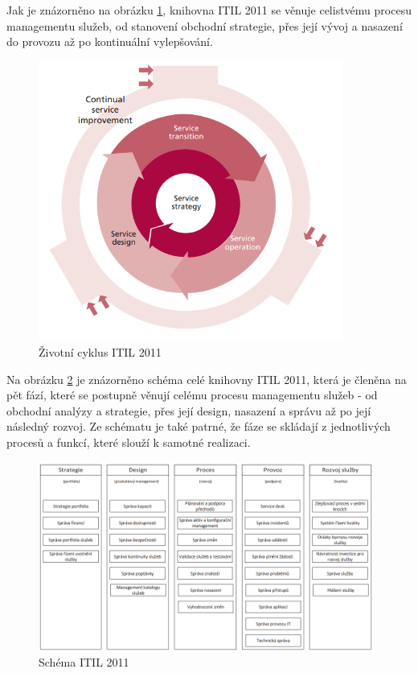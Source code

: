 \documentclass[
  digital,     %
  twoside,     %
  lof,         %
  lot,         %
]{fithesis4}
\begin{document}
Jak je znázorněno na obrázku \ref{fig:itil3_lifecycle}, knihovna ITIL 2011 se věnuje celistvému procesu managementu služeb, od stanovení obchodní strategie, přes její vývoj a nasazení do provozu až po kontinuální vylepšování. 
  
\begin{figure}[h]
  \begin{center}
          \includegraphics[width=10cm]{img/itil_V3_proces.png}
  \end{center}
  \caption{Životní cyklus ITIL 2011 \parencite[s.~7]{Carlidge2007}}
  \label{fig:itil3_lifecycle}
\end{figure}  

Na obrázku \ref{fig:itil3_schema} je znázorněno schéma celé knihovny ITIL 2011, která je členěna na pět fází, které se postupně věnují celému procesu managementu služeb - od obchodní analýzy a strategie, přes její design, nasazení a správu až po její následný rozvoj. Ze schématu je také patrné, že fáze se skládají z jednotlivých procesů a funkcí, které slouží k samotné realizaci.

\begin{figure}[h]
  \begin{center}
          \includegraphics[width=11cm]{img/itil_V3_schema.png}
  \end{center}
  \caption{Schéma ITIL 2011 \parencite[s.~32]{Matula2017}}
  \label{fig:itil3_schema}
\end{figure} 
\end{document}
